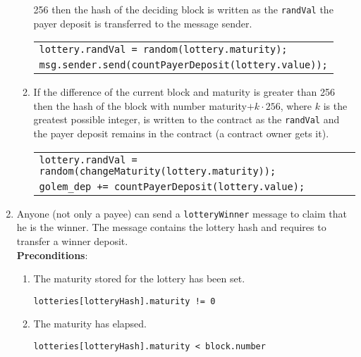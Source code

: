 \documentclass[a4paper]{article}
\begin{document}
\begin{enumerate}
\begin{enumerate}
                256 then  the hash of the deciding block is written as the \texttt{randVal} the payer deposit is
                transferred to the message sender.
                \begin{center}
                    \begin{tabular}{l}
                        \texttt{lottery.randVal = random(lottery.maturity);}\\
                        \texttt{msg.sender.send(countPayerDeposit(lottery.value));}
                    \end{tabular}
                \end{center}
            \item If the difference of the current block and maturity is greater than 256 then the hash of the block
            with number maturity$+k \cdot 256$, where $k$ is the greatest possible integer, is written to the contract
            as the \texttt{randVal} and the payer deposit remains in the contract (a contract owner gets it).
            \begin{center}
                \begin{tabular}{l}
                    \texttt{lottery.randVal = random(changeMaturity(lottery.maturity));}\\
		            \texttt{golem\_dep += countPayerDeposit(lottery.value);}
		        \end{tabular}
		    \end{center}
        \end{enumerate}
        \item Anyone (not only a payee) can send a \texttt{lotteryWinner} message to claim that he is the winner.
            The message contains the lottery hash and requires to transfer a winner deposit.\\
            \textbf{Preconditions}:
            \begin{enumerate}
                \item The maturity stored for the lottery has been set.
                    \begin{center}
                        \texttt{lotteries[lotteryHash].maturity != 0}
                    \end{center}
                \item The maturity has elapsed.
                    \begin{center}
		                \texttt{lotteries[lotteryHash].maturity < block.number}
		            \end{center}

\end{enumerate}
\end{enumerate}
\end{document}
